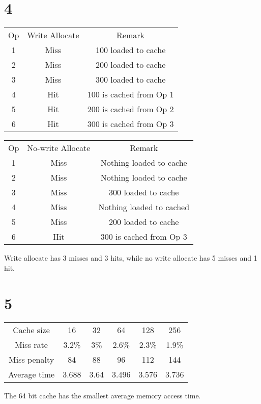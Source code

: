 \documentclass{article}
\begin{document}
\begin{multicols}{2}
    \section*{4}
    \begin{center}
        \begin{tabular}{ c c c }
            Op & Write Allocate & Remark                  \\
            1  & Miss           & 100 loaded to cache     \\
            2  & Miss           & 200 loaded to cache     \\
            3  & Miss           & 300 loaded to cache     \\
            4  & Hit            & 100 is cached from Op 1 \\
            5  & Hit            & 200 is cached from Op 2 \\
            6  & Hit            & 300 is cached from Op 3 \\
        \end{tabular}
    \end{center}

    \begin{center}
        \begin{tabular}{ c c c }
            Op & No-write Allocate & Remark                   \\
            1  & Miss              & Nothing loaded to cache  \\
            2  & Miss              & Nothing loaded to cache  \\
            3  & Miss              & 300 loaded to cache      \\
            4  & Miss              & Nothing loaded to cached \\
            5  & Miss              & 200 loaded to cache      \\
            6  & Hit               & 300 is cached from Op 3  \\
        \end{tabular}
    \end{center}

    Write allocate has 3 misses and 3 hits, while no write allocate has 5 misses and 1 hit.

    \section*{5}
    \begin{center}
        \begin{tabular}{ c c c c c c }
            Cache size   & 16    & 32   & 64    & 128   & 256   \\
            Miss rate    & 3.2\% & 3\%  & 2.6\% & 2.3\% & 1.9\% \\
            Miss penalty & 84    & 88   & 96    & 112   & 144   \\
            Average time & 3.688 & 3.64 & 3.496 & 3.576 & 3.736
        \end{tabular}
    \end{center}
    The 64 bit cache has the smallest average memory access time.

\end{multicols}
\end{document}
